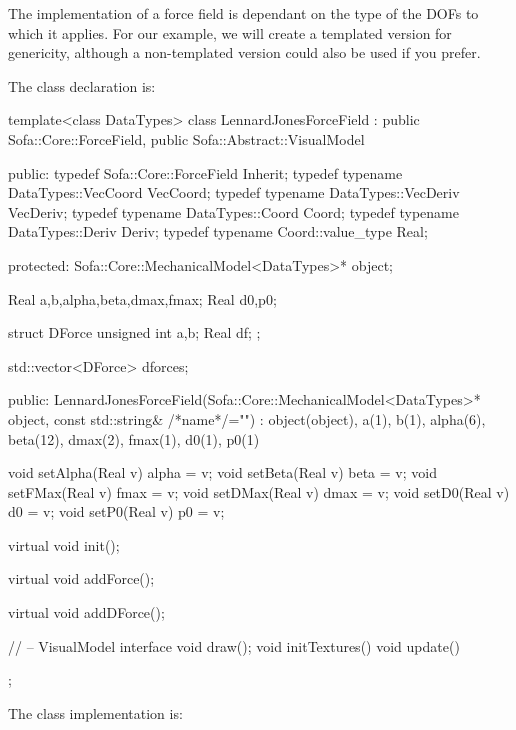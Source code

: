 The implementation of a force field is dependant on the type of the DOFs to which it applies. For our example, we will create a templated version for genericity, although a non-templated version could also be used if you prefer.

The class declaration is:

\begin{code_cpp}
template<class DataTypes>
class LennardJonesForceField : public Sofa::Core::ForceField, public Sofa::Abstract::VisualModel
{
public:
	typedef Sofa::Core::ForceField Inherit;
	typedef typename DataTypes::VecCoord VecCoord;
	typedef typename DataTypes::VecDeriv VecDeriv;
	typedef typename DataTypes::Coord Coord;
	typedef typename DataTypes::Deriv Deriv;
	typedef typename Coord::value_type Real;
	
protected:
	Sofa::Core::MechanicalModel<DataTypes>* object;
	
	Real a,b,alpha,beta,dmax,fmax;
	Real d0,p0;

	struct DForce
	{
		unsigned int a,b;
		Real df;
	};
	
	std::vector<DForce> dforces;
	
public:
	LennardJonesForceField(Sofa::Core::MechanicalModel<DataTypes>* object, const std::string& /*name*/="")
	: object(object), a(1), b(1), alpha(6), beta(12), dmax(2), fmax(1), d0(1), p0(1)
	{
	}
	
	void setAlpha(Real v) { alpha = v; }
	void setBeta(Real v) { beta = v; }
	void setFMax(Real v) { fmax = v; }
	void setDMax(Real v) { dmax = v; }
	void setD0(Real v) { d0 = v; }
	void setP0(Real v) { p0 = v; }

	virtual void init();
	
	virtual void addForce();
	
	virtual void addDForce();
	
	// -- VisualModel interface
	void draw();
	void initTextures() { }
	void update() { }
};
\end{code_cpp}

The class implementation is:

